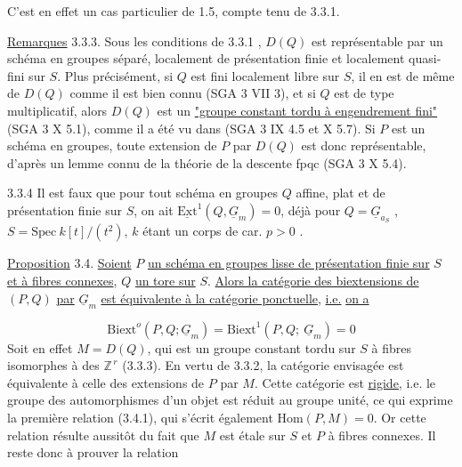 
C'est en effet un cas particulier de 1.5, compte tenu de 3.3.1.

\underline{Remarques} 3.3.3. Sous les conditions de 3.3.1 , $D(Q)$ est représentable par un schéma en groupes séparé, localement de présentation finie et localement quasi-fini sur $S$. Plus précisément, si $Q$ est fini localement libre sur $S$, il en est de même de $D(Q)$ comme il est bien connu (SGA 3 VII 3), et si $Q$ est de type multiplicatif, alors $D(Q)$ est un \underline{"groupe constant tordu à engendrement fini"} (SGA 3 X 5.1), comme il a été vu dans (SGA 3 IX 4.5 et X 5.7). Si $P$ est un schéma en groupes, toute extension de $P$ par $D(Q)$ est donc représentable, d'après un lemme connu de la théorie de la descente fpqc (SGA 3 X 5.4).

3.3.4 \qquad Il est faux \quad que pour tout schéma en groupes $Q$ affine, plat et de présentation finie sur $S$, on ait $\underline{\mathrm{Ext}}^1(Q,\underline{G}_m) = 0$, déjà pour $Q = \underline{G}_{a_S}$ , $S = \mathrm{Spec}\ k[t]/(t^2)$, $k$ étant un corps de car. $p > 0$ .

\underline{Proposition} 3.4. \underline{Soient} $P$ \underline{un schéma en groupes lisse de présentation finie sur} $S$ \underline{et à fibres connexes}, $Q$ \underline{un tore sur} $S$. \underline{Alors la catégorie des biextensions de} $(P,Q)$ \underline{par} $\underline{G}_m$ \underline{est équivalente à la catégorie ponctuelle}, \underline{i.e.} \underline{on a}

\begin{equation}\tag{3.4.1}
\mathrm{Biext}^{o}(P,Q;\underline{G}_m) = \mathrm{Biext}^1(P,Q;\ \underline{G}_m) = 0
\end{equation}
Soit en effet $M = D(Q)$, qui est un groupe constant tordu sur $S$ à fibres isomorphes à des $\mathbb{Z}^{\,r}$ (3.3.3). En vertu de 3.3.2, la catégorie envisagée est équivalente à celle des extensions de $P$ par $M$. Cette catégorie est \underline{rigide}, i.e. le groupe des automorphismes d'un objet
est réduit au groupe unité, ce qui exprime la première relation (3.4.1), qui s'écrit également $\mathrm{Hom}(P,M) = 0$. Or cette relation résulte aussitôt du fait que $M$ est étale sur $S$ et $P$ à fibres connexes. Il reste donc à prouver la relation


